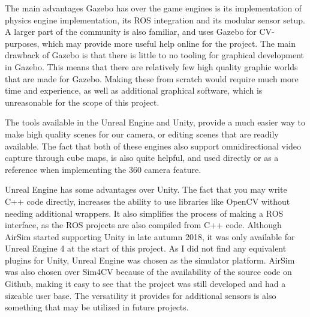 The main advantages Gazebo has over the game engines is its implementation of physics engine implementation, its ROS integration and its modular sensor setup. A larger part of the community is also familiar, and uses Gazebo for CV-purposes, which may provide more useful help online for the project. The main drawback of Gazebo is that there is little to no tooling for graphical development in Gazebo. This means that there are relatively few high quality graphic worlds that are made for Gazebo. Making these from scratch would require much more time and experience, as well as additional graphical software, which is unreasonable for the scope of this project. 

The tools available in the Unreal Engine and Unity, provide a much easier way to make high quality scenes for our camera, or editing scenes that are readily available. The fact that both of these engines also support omnidirectional video capture through cube maps, is also quite helpful, and used directly or as a reference when implementing the 360 camera feature. 

Unreal Engine has some advantages over Unity. The fact that you may write C++ code directly, increases the ability to use libraries like OpenCV without needing additional wrappers. It also simplifies the process of making a ROS interface, as the ROS projects are also compiled from C++ code. Although AirSim started supporting Unity in late autumn 2018, it was only available for Unreal Engine 4 at the start of this project. As I did not find any equivalent plugins for Unity, Unreal Engine was chosen as the simulator platform. AirSim was also chosen over Sim4CV because of the availability of the source code on Github, making it easy to see that the project was still developed and had a sizeable user base. The versatility it provides for additional sensors is also something that may be utilized in future projects.

\cleardoublepage